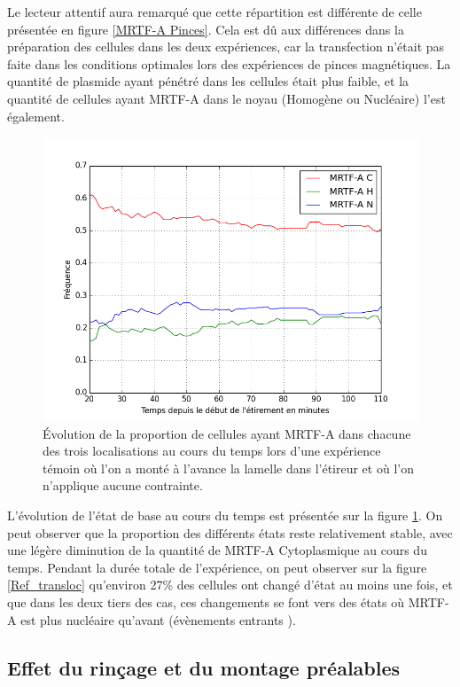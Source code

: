 Le lecteur attentif aura remarqué que cette répartition est différente de celle présentée en figure \ref{MRTF-A Pinces}. 
Cela est dû aux différences dans la préparation des cellules dans les deux expériences, car la transfection n'était pas faite dans les conditions optimales lors des expériences de pinces magnétiques. 
La quantité de plasmide ayant pénétré dans les cellules était plus faible, et la quantité de cellules ayant MRTF-A dans le noyau (Homogène ou Nucléaire) l'est également. 
\begin{figure}
\includegraphics[scale=0.4]{Figures/CHN_vs_Temps_reference.png} 
\caption{\label{Reference_dynamique} \'E{}volution de la proportion de cellules ayant MRTF-A dans chacune des trois localisations au cours du temps lors d'une expérience témoin où l'on a monté à l'avance la lamelle dans l'étireur et où l'on n'applique aucune contrainte.}
\end{figure}

L'évolution de l'état de base au cours du temps est présentée sur la figure \ref{Reference_dynamique}. On peut observer que la proportion des différents états reste relativement stable, avec une légère diminution de la quantité de MRTF-A Cytoplasmique au cours du temps. 
Pendant la durée totale de l'expérience, on peut observer sur la figure \ref{Ref_transloc} qu'environ 27\% des cellules ont changé d'état au moins une fois, et que dans les deux tiers des cas, ces changements se font vers des états où MRTF-A est plus nucléaire qu'avant (évènements \og entrants \fg). 

\subsection{Effet du rinçage et du montage préalables \label{Rinçage}}


